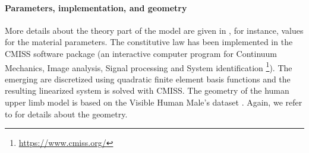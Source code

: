 \paragraph{Parameters, implementation, and geometry}

More details about the theory part of the model are given in
,
for instance, values for the material parameters.
%
The constitutive law has been implemented in the CMISS software package
(an interactive computer program for Continuum Mechanics,
Image analysis, Signal processing and System identification%
\footnote{%
  \url{https://www.cmiss.org/}%
}).
The emerging \pdes are discretized using quadratic finite element basis
functions and the resulting linearized system is solved with CMISS.
%
The geometry of the human upper limb model is based on
the Visible Human Male's dataset \cite{Spitzer96Visible}.
Again, we refer to  for details
about the geometry.
